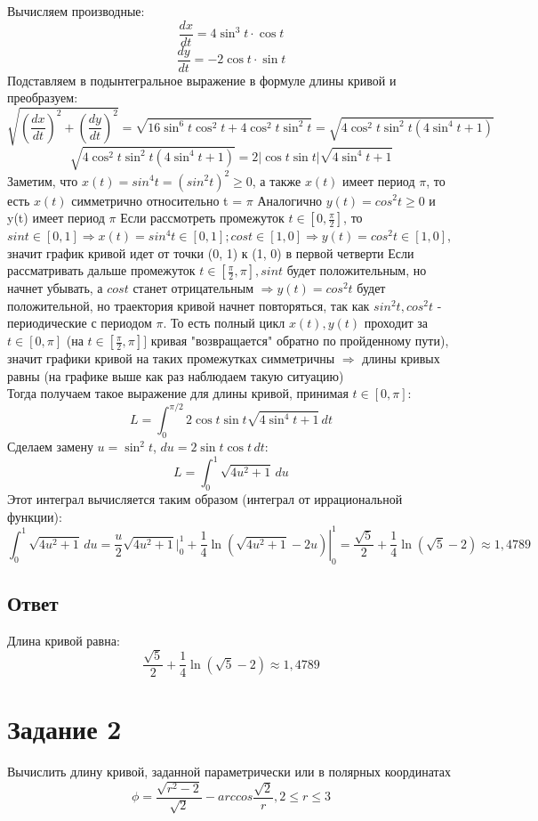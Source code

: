 \documentclass{article}
\begin{document}
Вычисляем производные:
\[
\frac{dx}{dt} = 4 \sin^3 t \cdot \cos t
\]
\[
\frac{dy}{dt} = -2 \cos t \cdot \sin t
\]
Подставляем в подынтегральное выражение в формуле длины кривой и преобразуем:
\[
\sqrt{\left(\frac{dx}{dt}\right)^2 + \left(\frac{dy}{dt}\right)^2} = \sqrt{16 \sin^6 t \cos^2 t + 4 \cos^2 t \sin^2 t} = \sqrt{4 \cos^2 t \sin^2 t (4 \sin^4 t + 1)}
\]
\[
    \sqrt{4 \cos^2 t \sin^2 t (4 \sin^4 t + 1)} = 2 |\cos t \sin t| \sqrt{4 \sin^4 t + 1}
\]
Заметим, что $x(t) = sin^4t = (sin^2t)^2 \geq 0$, а также $x(t)$ имеет период $\pi$, то есть $x(t)$ симметрично относительно t = $\pi$
Аналогично $y(t)=cos^2t\geq 0$ и y(t) имеет период $\pi$
Если рассмотреть промежуток $t \in [0, \frac{\pi}{2}]$, то $sint \in [0, 1] \Longrightarrow x(t) = sin^4t \in [0,1]; cost\in [1, 0] \Longrightarrow y(t)=cos^2t\in[1, 0]$, значит график кривой идет от точки (0, 1) к (1, 0) в первой четверти
Если рассматривать дальше промежуток $t\in[\frac{\pi}{2}, \pi], sint$ будет положительным, но начнет убывать, а $cost$ станет отрицательным $\Rightarrow y(t)=cos^2t$ будет положительной, но траектория кривой начнет повторяться, так как $sin^2t, cos^2t$ - периодические с периодом $\pi$. То есть полный цикл $x(t), y(t)$ проходит за $t\in[0, \pi]$ (на $t\in[\frac{\pi}{2}, \pi]]$ кривая "возвращается" обратно по пройденному пути), значит графики кривой на таких промежутках симметричны $\Rightarrow$ длины кривых равны (на графике выше как раз наблюдаем такую ситуацию)\\
Тогда получаем такое выражение для длины кривой, принимая $t\in[0, \pi]$:
\[
L = \int_0^{\pi/2} 2\cos t \sin t \sqrt{4 \sin^4 t + 1} \, dt
\]
Сделаем замену \( u = \sin^2 t \), \( du = 2 \sin t \cos t \, dt \):
\[
L = \int_0^1 \sqrt{4u^2 + 1} \, du
\]
Этот интеграл вычисляется таким образом (интеграл от иррациональной функции):
\[
\int_0^{1} \sqrt{4u^2 + 1} \, du = \left. \frac{u}{2} \sqrt{4u^2 + 1} \Big|_0^1+ \frac{1}{4} \ln \left(\sqrt{4u^2 + 1} -2u \right) \right|_0^1 = \frac{\sqrt{5}}{2} + \frac{1}{4} \ln (\sqrt{5} - 2 ) \approx 1,4789
\]


\subsection*{Ответ}
Длина кривой равна:
\[
\boxed{\frac{\sqrt{5}}{2} + \frac{1}{4} \ln (\sqrt{5} - 2 ) \approx 1,4789}
\]
\section*{Задание 2}
Вычислить длину кривой, заданной параметрически или в
полярных координатах
\[
\phi = \frac{\sqrt{r^2-2}}{\sqrt{2}}-arccos\frac{\sqrt{2}}{r}, 2 \leq r \leq3
\]
\end{document}
